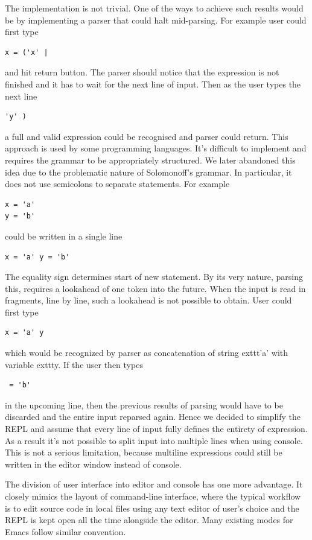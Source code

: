 The implementation is not trivial. One of the ways to achieve such results would be by implementing a parser that could halt mid-parsing. For example user could first type
\begin{lstlisting}
x = ('x' |
\end{lstlisting}
and hit return button. The parser should notice that the expression is not finished and it has to wait for the next line of input.  Then as the user types the next line
\begin{lstlisting}
'y' )
\end{lstlisting}
a full and valid expression could be recognised and parser could return.
This approach is used by some programming languages. It's difficult to implement and requires the grammar to be appropriately structured. We later abandoned this idea due to the problematic nature of Solomonoff's grammar. In particular, it does not use semicolons to separate statements. For example
\begin{lstlisting}
x = 'a' 
y = 'b'
\end{lstlisting}
could be written in a single line
\begin{lstlisting}
x = 'a' y = 'b'
\end{lstlisting}
The equality sign determines start of new statement. By its very nature, parsing this, requires a lookahead of one token into the future. When the input is read in fragments, line by line, such a lookahead is not possible to obtain.
User could first type
\begin{lstlisting}
x = 'a' y
\end{lstlisting}
which would be recognized by parser as concatenation of string     exttt{'a'} with variable     exttt{y}. If the user then types
\begin{lstlisting}
 = 'b'
\end{lstlisting}
in the upcoming line, then the previous results of parsing would have to be discarded and the entire input reparsed again. Hence we decided to simplify the REPL and assume that every line of input fully defines the entirety of expression. As a result it's not possible to split input into multiple lines when using console. This is not a serious limitation, because multiline expressions could still be written in the editor window instead of console. 

The division of user interface into editor and console has one more advantage. It closely mimics the layout of command-line interface, where the typical workflow is to edit source code in local files using any text editor of user's choice and the REPL is kept open all the time alongside the editor. Many existing modes for Emacs follow similar convention.

